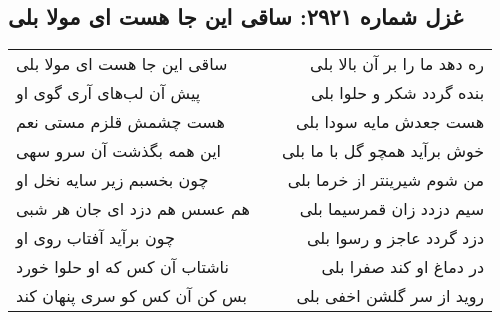 \begin{center}
\section*{غزل شماره ۲۹۲۱: ساقی این جا هست ای مولا بلی}
\label{sec:2921}
\begin{longtable}{l p{0.5cm} r}
ساقی این جا هست ای مولا بلی
&&
ره دهد ما را بر آن بالا بلی
\\
پیش آن لب‌های آری گوی او
&&
بنده گردد شکر و حلوا بلی
\\
هست چشمش قلزم مستی نعم
&&
هست جعدش مایه سودا بلی
\\
این همه بگذشت آن سرو سهی
&&
خوش برآید همچو گل با ما بلی
\\
چون بخسبم زیر سایه نخل او
&&
من شوم شیرینتر از خرما بلی
\\
هم عسس هم دزد ای جان هر شبی
&&
سیم دزدد زان قمرسیما بلی
\\
چون برآید آفتاب روی او
&&
دزد گردد عاجز و رسوا بلی
\\
ناشتاب آن کس که او حلوا خورد
&&
در دماغ او کند صفرا بلی
\\
بس کن آن کس کو سری پنهان کند
&&
روید از سر گلشن اخفی بلی
\\
\end{longtable}
\end{center}

